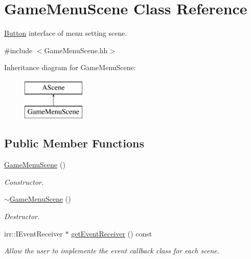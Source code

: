 \hypertarget{classGameMenuScene}{}\section{Game\+Menu\+Scene Class Reference}
\label{classGameMenuScene}


\hyperlink{classButton}{Button} interface of menu setting scene.  




{\ttfamily \#include $<$Game\+Menu\+Scene.\+hh$>$}

Inheritance diagram for Game\+Menu\+Scene\+:\begin{figure}[H]
\begin{center}
\leavevmode
\includegraphics[height=2.000000cm]{classGameMenuScene}
\end{center}
\end{figure}
\subsection*{Public Member Functions}
\begin{DoxyCompactItemize}
\item 
\hyperlink{classGameMenuScene_a990633f8037ab2691f0aca251f3d89ee}{Game\+Menu\+Scene} ()
\begin{DoxyCompactList}\small\item\em Constructor. \end{DoxyCompactList}\item 
\hyperlink{classGameMenuScene_afbc6eddfe5f84b6f0b21bc652c9fc435}{$\sim$\+Game\+Menu\+Scene} ()
\begin{DoxyCompactList}\small\item\em Destructor. \end{DoxyCompactList}\item 
irr\+::\+I\+Event\+Receiver $\ast$ \hyperlink{classGameMenuScene_adcb01430b24486c4e5d0157fc32d7611}{get\+Event\+Receiver} () const
\begin{DoxyCompactList}\small\item\em Allow the user to implemente the event callback class for each scene. \end{DoxyCompactList}\end{DoxyCompactItemize}


